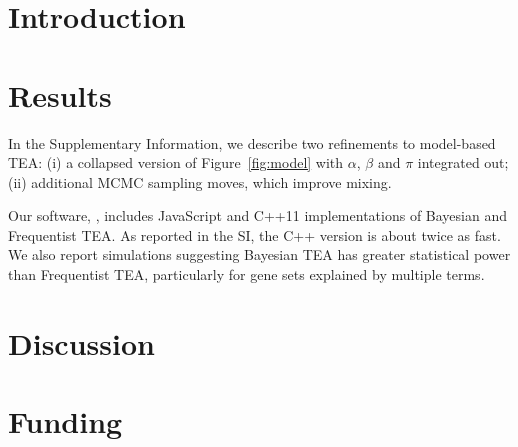 \documentclass{bioinfo}
\begin{document}

\newcommand\structabs[5]{
\abstract{
{\bf Motivation.}
#1
{\bf Results.}
#2
{\bf Availability and Implementation.}
#3
{\bf Contact.}
#4
{\bf Supplementary Information.}
#5
}
\maketitle
}



\title[\shorttitle]{\longtitle}
\author[\shortauthors]{\longauthors}
\address{ \authorsaddress }

\corresp{}

\history{}

\editor{}



\section*{Introduction}


\section*{Results}
In the Supplementary Information, we describe two refinements to model-based TEA:
(i) a collapsed version of Figure~\ref{fig:model} with $\alpha$, $\beta$ and $\pi$ integrated out;
(ii) additional MCMC sampling moves, which improve mixing.

Our software, \wtfgenes, includes JavaScript and C++11 implementations of Bayesian and Frequentist TEA.
As reported in the SI, the C++ version is about twice as fast.
We also report simulations suggesting Bayesian TEA has greater statistical power than Frequentist TEA, particularly for gene sets explained by multiple terms.



\section*{Discussion}


\section*{Funding}




\end{document}

